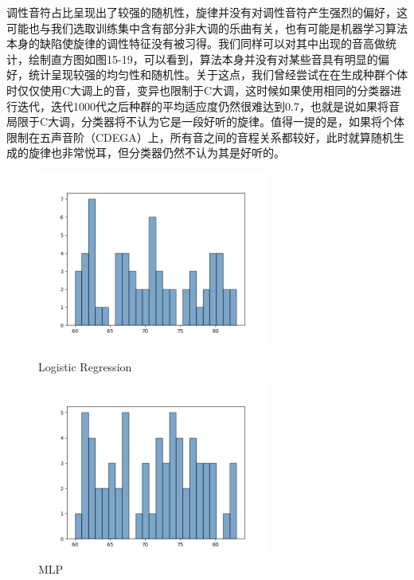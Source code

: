 \documentclass[UTF8,a4paper,10pt]{ctexart}
\begin{document}
\begin{itemize}
调性音符占比呈现出了较强的随机性，旋律并没有对调性音符产生强烈的偏好，这可能也与我们选取训练集中含有部分非大调的乐曲有关，也有可能是机器学习算法本身的缺陷使旋律的调性特征没有被习得。我们同样可以对其中出现的音高做统计，绘制直方图如图15-19，可以看到，算法本身并没有对某些音具有明显的偏好，统计呈现较强的均匀性和随机性。关于这点，我们曾经尝试在在生成种群个体时仅仅使用C大调上的音，变异也限制于C大调，这时候如果使用相同的分类器进行迭代，迭代1000代之后种群的平均适应度仍然很难达到0.7，也就是说如果将音局限于C大调，分类器将不认为它是一段好听的旋律。值得一提的是，如果将个体限制在五声音阶（CDEGA）上，所有音之间的音程关系都较好，此时就算随机生成的旋律也非常悦耳，但分类器仍然不认为其是好听的。

\begin{figure}[H]
\begin{minipage}[t]{0.5\linewidth}
\centering
\includegraphics[width=3in]{output_logreg_hist_1.png}
\caption{Logistic Regression}
\label{fig:side:a}
\end{minipage}%
\begin{minipage}[t]{0.5\linewidth}
\centering
\includegraphics[width=3in]{output_mlp_hist_1.png}
\caption{MLP}
\label{fig:side:b}
\end{minipage}
\end{figure}


\end{itemize}
\end{document}
